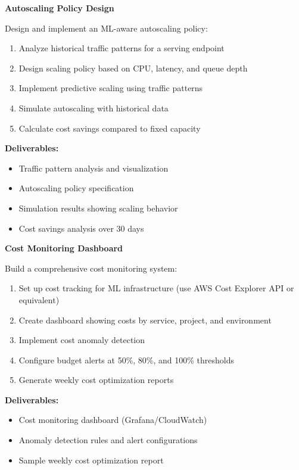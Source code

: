 \begin{exercise}
\textbf{Autoscaling Policy Design}

Design and implement an ML-aware autoscaling policy:

\begin{enumerate}
    \item Analyze historical traffic patterns for a serving endpoint
    \item Design scaling policy based on CPU, latency, and queue depth
    \item Implement predictive scaling using traffic patterns
    \item Simulate autoscaling with historical data
    \item Calculate cost savings compared to fixed capacity
\end{enumerate}

\textbf{Deliverables:}
\begin{itemize}
    \item Traffic pattern analysis and visualization
    \item Autoscaling policy specification
    \item Simulation results showing scaling behavior
    \item Cost savings analysis over 30 days
\end{itemize}
\end{exercise}

\begin{exercise}
\textbf{Cost Monitoring Dashboard}

Build a comprehensive cost monitoring system:

\begin{enumerate}
    \item Set up cost tracking for ML infrastructure (use AWS Cost Explorer API or equivalent)
    \item Create dashboard showing costs by service, project, and environment
    \item Implement cost anomaly detection
    \item Configure budget alerts at 50\%, 80\%, and 100\% thresholds
    \item Generate weekly cost optimization reports
\end{enumerate}

\textbf{Deliverables:}
\begin{itemize}
    \item Cost monitoring dashboard (Grafana/CloudWatch)
    \item Anomaly detection rules and alert configurations
    \item Sample weekly cost optimization report
\end{itemize}
\end{exercise}


